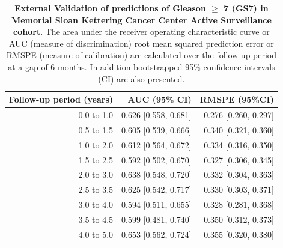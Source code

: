 \begin{table}[!htb]
\small\sf\centering
\caption{\textbf{External Validation of predictions of Gleason $\geq$ 7 (GS7) in Memorial Sloan Kettering Cancer Center Active Surveillance cohort}. The area under the receiver operating characteristic curve or AUC (measure of discrimination) root mean squared prediction error or RMSPE (measure of calibration) are calculated over the follow-up period at a gap of 6 months. In addition bootstrapped 95\% confidence intervals (CI) are also presented.}
\label{tab:AUC_PE_MSKCC}
\begin{tabular}{r|r|r}
\hline
\hline
Follow-up period (years) & AUC (95\% CI) & RMSPE (95\%CI)\\ 
\hline
0.0 to 1.0 & 0.626 [0.558, 0.681]  & 0.276 [0.260, 0.297]\\
0.5 to 1.5 & 0.605 [0.539, 0.666]  & 0.340 [0.321, 0.360]\\
1.0 to 2.0 & 0.612 [0.564, 0.672]  & 0.334 [0.316, 0.350]\\
1.5 to 2.5 & 0.592 [0.502, 0.670]  & 0.327 [0.306, 0.345]\\
2.0 to 3.0 & 0.638 [0.548, 0.720]  & 0.332 [0.304, 0.363]\\
2.5 to 3.5 & 0.625 [0.542, 0.717]  & 0.330 [0.303, 0.371]\\
3.0 to 4.0 & 0.594 [0.511, 0.655]  & 0.328 [0.281, 0.368]\\
3.5 to 4.5 & 0.599 [0.481, 0.740]  & 0.350 [0.312, 0.373]\\
4.0 to 5.0 & 0.653 [0.562, 0.724]  & 0.355 [0.320, 0.380]\\
\hline
\end{tabular}	
\end{table}

